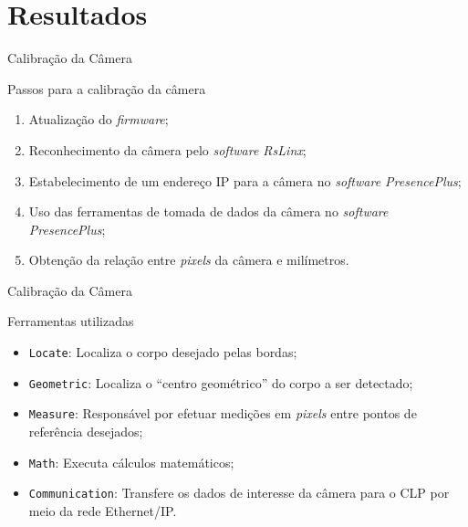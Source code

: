 \documentclass[10pt]{beamer}
\begin{document}
\section{Resultados}

\begin{frame}[fragile]{Calibração da Câmera}
\begin{block}{Passos para a calibração da câmera}
\begin{enumerate}
	\item Atualização do \textit{firmware};
	\item Reconhecimento da câmera pelo \textit{software RsLinx};
	\item Estabelecimento de um endereço IP para a câmera no \textit{software PresencePlus};
	\item Uso das ferramentas de tomada de dados da câmera no \textit{software PresencePlus};
	\item Obtenção da relação entre \textit{pixels} da câmera e milímetros.
\end{enumerate}
\end{block}
\end{frame}

\begin{frame}[fragile]{Calibração da Câmera}
\begin{block}{Ferramentas utilizadas}
\begin{itemize}
	\item \texttt{Locate}: Localiza o corpo desejado pelas bordas;
	\item \texttt{Geometric}: Localiza o ``centro geométrico'' do corpo a ser detectado;
	\item \texttt{Measure}: Responsável por efetuar medições em \textit{pixels} entre pontos de referência desejados;
	\item \texttt{Math}: Executa cálculos matemáticos;
	\item \texttt{Communication}: Transfere os dados de interesse da câmera para o CLP por meio da rede Ethernet/IP.
\end{itemize}
\end{block}
\end{frame}
\end{document}
